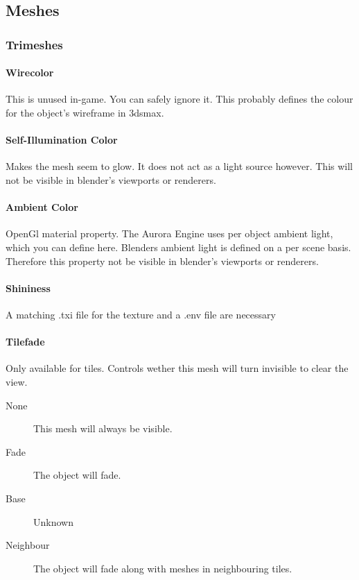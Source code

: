 \subsection{Meshes}

\subsubsection{Trimeshes}

\paragraph*{Wirecolor}
This is unused in-game. You can safely ignore it. This probably defines the
colour for the object's wireframe in 3dsmax.

\paragraph*{Self-Illumination Color}
Makes the mesh seem to glow. It does not act as a light source however.
This will not be visible in blender's viewports or renderers.

\paragraph*{Ambient Color}
OpenGl material property. The Aurora Engine uses per object ambient light,
which you can define here. Blenders ambient light is defined on a per scene
basis. Therefore this property not be visible in blender's viewports or
renderers.

\paragraph*{Shininess}
A matching .txi file for the texture and a .env file are necessary

\paragraph*{Tilefade}
Only available for tiles. Controls wether this mesh will turn invisible to
clear the view.
\begin{description}
    \item[None] This mesh will always be visible.
    \item[Fade] The object will fade.
    \item[Base] Unknown
    \item[Neighbour] The object will fade along with meshes in neighbouring tiles.
\end{description}

